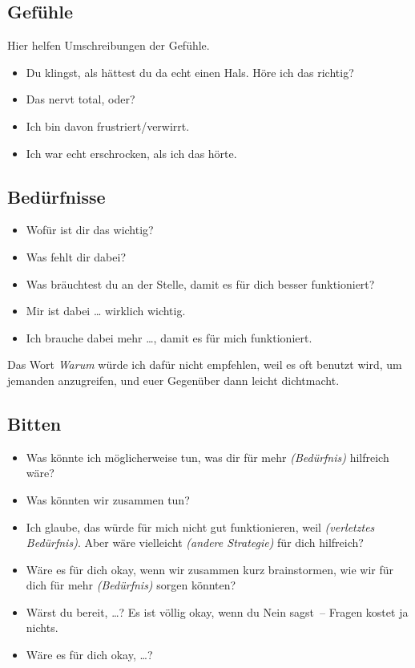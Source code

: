 \subsection{Gefühle}

Hier helfen Umschreibungen der Gefühle.

\begin{itemize}
  \item Du klingst, als hättest du da echt einen Hals. Höre ich das richtig?
  \item Das nervt total, oder?
  \item Ich bin davon frustriert/verwirrt.
  \item Ich war echt erschrocken, als ich das hörte.
\end{itemize}


\subsection{Bedürfnisse}

\begin{itemize}
  \item Wofür ist dir das wichtig?
  \item Was fehlt dir dabei?
  \item Was bräuchtest du an der Stelle, damit es für dich besser funktioniert?
  \item Mir ist dabei \ldots{} wirklich wichtig.
  \item Ich brauche dabei mehr \ldots, damit es für mich funktioniert.
\end{itemize}

Das Wort \emph{Warum} würde ich dafür nicht empfehlen, weil es oft benutzt wird, um jemanden anzugreifen, und euer Gegenüber dann leicht dichtmacht.


\subsection{Bitten}

\begin{itemize}
  \item Was könnte ich möglicherweise tun, was dir für mehr \emph{(Bedürfnis)} hilfreich wäre?
  \item Was könnten wir zusammen tun?
  \item Ich glaube, das würde für mich nicht gut funktionieren, weil \emph{(verletztes Bedürfnis)}. Aber wäre vielleicht \emph{(andere Strategie)} für dich hilfreich?
  \item Wäre es für dich okay, wenn wir zusammen kurz brainstormen, wie wir für dich für mehr \emph{(Bedürfnis)} sorgen könnten?
  \item Wärst du bereit, \ldots? Es ist völlig okay, wenn du Nein sagst~-- Fragen kostet ja nichts.
  \item Wäre es für dich okay, \ldots?
\end{itemize}

